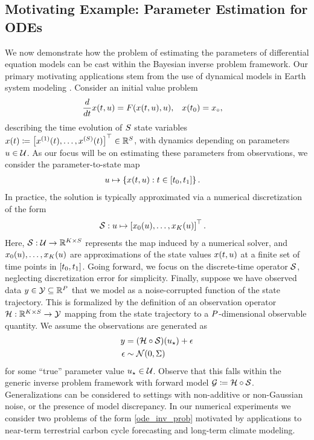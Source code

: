 \documentclass[12pt]{article}
\begin{document}
\subsection{Motivating Example: Parameter Estimation for ODEs} \label{dynamical_models}
We now demonstrate how the problem of estimating the parameters of differential equation models 
 can be cast within the Bayesian inverse problem framework. Our primary motivating applications 
 stem from the use of dynamical models in Earth system modeling  \citep{ESM_modeling_2pt0,paramLSM}.
Consider an initial value problem 
\begin{align}
\frac{d}{d\Time} \state(\Time, \Par) &= \odeRHS(\state(\Time, \Par), \Par), &&x(\timeStart) = \stateIC, \label{ode_ivp}
\end{align}
describing the time evolution of $\dimState$ state variables 
$\state(\Time) \Def \left[\indexState[1]{\state}(\Time), \dots, \indexState[\dimState]{\state}(\Time)\right]^\top \in \mathbb{R}^{\dimState}$,
with dynamics depending on parameters $\Par \in \parSpace$. As our focus will be on estimating these parameters 
from observations, we consider the parameter-to-state map
\begin{align}
\Par &\mapsto \left\{\state(\Time, \Par) :  \Time \in [\timeStart, \timeEnd] \right\}.
\end{align}
In practice, the solution is typically approximated via a numerical discretization of the form 
\begin{align}
\solutionOp: \Par &\mapsto \left[\indexTime[0]{\state}(\Par), \dots, \indexTime[\NTimeStep]{\state}(\Par) \right]^\top. 
\end{align}
Here, $\solutionOp: \parSpace \to \R^{\NTimeStep \times \dimState}$ represents the map induced by a numerical solver, 
and $\indexTime[0]{\state}(\Par), \dots, \indexTime[\NTimeStep]{\state}(\Par)$ are approximations of the state 
values $\state(\Time, \Par)$ at a finite set of time points in $[\timeStart, \timeEnd]$. 
Going forward, we focus on the discrete-time operator $\solutionOp$, neglecting discretization error
for simplicity. Finally, suppose we have observed data $\obs \in \obsSpace \subseteq \R^{\dimObs}$ that we model as a
noise-corrupted function of the state trajectory. This is formalized by the definition of an observation operator 
$\obsOp: \R^{\NTimeStep \times \dimState} \to \obsSpace$ mapping from the state trajectory to a 
$\dimObs$-dimensional observable quantity. We assume the observations are generated as 
\begin{align}
\obs &= (\obsOp \circ \solutionOp)(\ParTrue) + \noise \label{ode_inv_prob} \\
\noise &\sim \Gaussian(0, \likPar) \nonumber 
\end{align}
for some ``true'' parameter value $\ParTrue \in \parSpace$. Observe that this falls within the generic 
inverse problem framework with forward model $\fwd \Def \obsOp \circ \solutionOp$. 
Generalizations can be considered to settings with non-additive or non-Gaussian noise, or the 
presence of model discrepancy. In our numerical experiments we consider two problems of the 
form \cref{ode_inv_prob} motivated by applications to near-term terrestrial carbon cycle forecasting and 
long-term climate modeling. 
\end{document}
